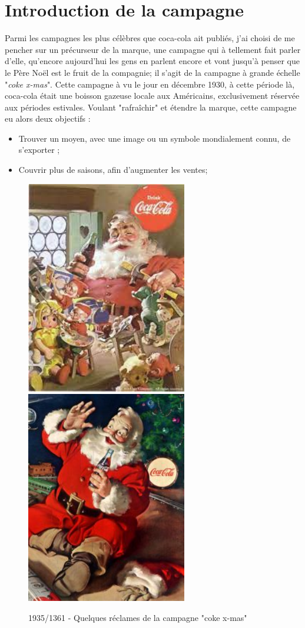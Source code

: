 

\section{Introduction de la campagne }

Parmi les campagnes les plus célèbres que coca-cola ait publiés, j'ai choisi de me pencher sur un précurseur de la marque, une campagne qui à tellement fait parler d'elle, qu'encore aujourd'hui les gens en parlent encore et vont jusqu'à penser que le Père Noël est le fruit de la compagnie;  il s'agit de la campagne à grande échelle "\textit{coke x-mas}".
Cette campagne à vu le jour en décembre 1930, à cette période là, coca-cola était une boisson gazeuse locale aux Américains, exclusivement réservée aux périodes estivales.
Voulant "rafraîchir" et étendre la marque, cette campagne eu alors deux objectifs : 

\begin{itemize}
\item Trouver un moyen, avec une image ou un symbole mondialement connu, de s'exporter ;
\item Couvrir plus de saisons, afin d'augmenter les ventes;
\end{itemize}

\begin{figure}[th]
\centering
\includegraphics[width=70mm]{medias/perenoel1}
\includegraphics[width=70mm]{medias/perenoel2}
\decoRule
\caption{1935/1361 - Quelques réclames de la campagne "coke x-mas"}
\end{figure}
